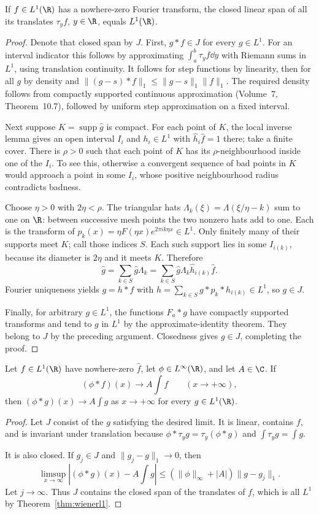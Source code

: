 \begin{theorem}[Wiener, 1932]\label{thm:wienerl1}
If $f\in L^1(\R)$ has a nowhere-zero Fourier transform, the closed linear span of all its translates $\tau_yf$, $y\in\R$, equals $L^1(\R)$.
\end{theorem}
\begin{proof}
Denote that closed span by $J$. First, $g*f\in J$ for every $g\in L^1$. For an interval indicator this follows by approximating $\int_a^b\tau_yf\dd y$ with Riemann sums in $L^1$, using translation continuity. It follows for step functions by linearity, then for all $g$ by density and $\|(g-s)*f\|_1\le\|g-s\|_1\|f\|_1$. The required density follows from compactly supported continuous approximation (Volume~7, Theorem~10.7), followed by uniform step approximation on a fixed interval.

Next suppose $K=\operatorname{supp}\hat g$ is compact. For each point of $K$, the local inverse lemma gives an open interval $I_i$ and $h_i\in L^1$ with $\hat h_i\hat f=1$ there; take a finite cover. There is $\rho>0$ such that each point of $K$ has its $\rho$-neighbourhood inside one of the $I_i$. To see this, otherwise a convergent sequence of bad points in $K$ would approach a point in some $I_i$, whose positive neighbourhood radius contradicts badness.

Choose $\eta>0$ with $2\eta<\rho$. The triangular hats $\Lambda_k(\xi)=\Lambda(\xi/\eta-k)$ sum to one on $\R$: between successive mesh points the two nonzero hats add to one. Each is the transform of $p_k(x)=\eta F(\eta x)e^{2\pi ik\eta x}\in L^1$. Only finitely many of their supports meet $K$; call those indices $S$. Each such support lies in some $I_{i(k)}$, because its diameter is $2\eta$ and it meets $K$. Therefore
\[\hat g=\sum_{k\in S}\hat g\Lambda_k
 =\sum_{k\in S}\hat g\Lambda_k\hat h_{i(k)}\hat f.
\]
Fourier uniqueness yields $g=h*f$ with $h=\sum_{k\in S}g*p_k*h_{i(k)}\in L^1$, so $g\in J$.

Finally, for arbitrary $g\in L^1$, the functions $F_a*g$ have compactly supported transforms and tend to $g$ in $L^1$ by the approximate-identity theorem. They belong to $J$ by the preceding argument. Closedness gives $g\in J$, completing the proof.
\end{proof}

\begin{theorem}\label{thm:wienertaub}
Let $f\in L^1(\R)$ have nowhere-zero $\hat f$, let $\phi\in L^\infty(\R)$, and let $A\in\C$. If
\[(\phi*f)(x)\longrightarrow A\int f\qquad(x\to+\infty),\]
then $(\phi*g)(x)\to A\int g$ as $x\to+\infty$ for every $g\in L^1(\R)$.
\end{theorem}
\begin{proof}
Let $J$ consist of the $g$ satisfying the desired limit. It is linear, contains $f$, and is invariant under translation because $\phi*\tau_yg=\tau_y(\phi*g)$ and $\int\tau_yg=\int g$.

It is also closed. If $g_j\in J$ and $\|g_j-g\|_1\to0$, then
\[\limsup_{x\to\infty}|(\phi*g)(x)-A\int g|
 \le(\|\phi\|_\infty+|A|)\|g-g_j\|_1.
\]
Let $j\to\infty$. Thus $J$ contains the closed span of the translates of $f$, which is all $L^1$ by Theorem~\ref{thm:wienerl1}.
\end{proof}

